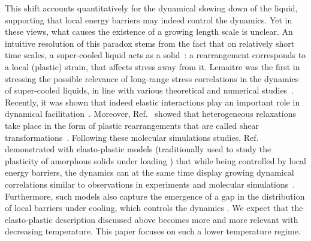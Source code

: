 \documentclass[pre,twocolumn,superscriptaddress,tightenlines,showpacs,longbibliography,floatfix,footinbib]{revtex4-1}
\begin{document}
This shift accounts quantitatively for the dynamical slowing down of the liquid,  supporting that local energy barriers may indeed control the dynamics. %
Yet in these views, what causes the existence of a growing length scale is unclear. 
An intuitive resolution of this paradox stems from the fact that on relatively short time scales, a super-cooled liquid acts as a solid~\cite{dyre2006colloquium,schroder2020solid}: a rearrangement corresponds to a local (plastic) strain, that  affects stress away from it. Lemaitre \cite{Lemaitre14} was the first in stressing the possible relevance of long-range stress correlations in the dynamics of super-cooled liquids, in line with various theoretical and numerical studies~\cite{chowdhury2016long,tong2020emergent,wu2015anisotropic,maier2017emergence,steffen2022molecular,flenner2015long,klochko2022theory}.  Recently, it was shown that indeed elastic interactions play an important role in dynamical facilitation~\cite{chacko2021elastoplasticity}.
Moreover, Ref.~\cite{lerbinger2022relevance} showed that heterogeneous relaxations take place in the form of plastic rearrangements that are called shear transformations~\cite{falk1998dynamics}. Following these molecular simulations studies, Ref.~\cite{ozawa2023elasticity} demonstrated with elasto-plastic models  (traditionally used to study the plasticity of amorphous solids under loading \cite{picard2004elastic,Nicolas2018,Vandembroucq2004,Lin2014b,rossi2022finite}) that while being controlled by local energy barriers, the dynamics can at the same time display growing dynamical correlations similar to observations in experiments and molecular simulations~\cite{berthier2005direct,berthier2011dynamical}. Furthermore, such models also capture the emergence of a gap in the distribution of local barriers under cooling, which controls the dynamics \cite{popovic2021thermally,ozawa2023elasticity}.
We expect that the elasto-plastic description discussed above becomes more and more relevant with decreasing temperature. This paper focuses on such a lower temperature regime.

\end{document}

